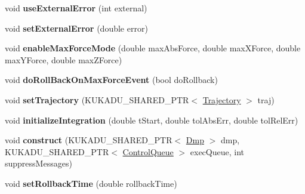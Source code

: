 \begin{DoxyCompactItemize}
\item 
\hypertarget{classkukadu_1_1DMPExecutor_af6bdcf008a271ebaf971e538ee7de962}{void {\bfseries use\-External\-Error} (int external)}\label{classkukadu_1_1DMPExecutor_af6bdcf008a271ebaf971e538ee7de962}

\item 
\hypertarget{classkukadu_1_1DMPExecutor_a0f61c96beb3e2d2d263d2de02da6afa4}{void {\bfseries set\-External\-Error} (double error)}\label{classkukadu_1_1DMPExecutor_a0f61c96beb3e2d2d263d2de02da6afa4}

\item 
\hypertarget{classkukadu_1_1DMPExecutor_a48f9f9b4b12ebce4423c0258be1c6eb5}{void {\bfseries enable\-Max\-Force\-Mode} (double max\-Abs\-Force, double max\-X\-Force, double max\-Y\-Force, double max\-Z\-Force)}\label{classkukadu_1_1DMPExecutor_a48f9f9b4b12ebce4423c0258be1c6eb5}

\item 
\hypertarget{classkukadu_1_1DMPExecutor_a4278c7a3e74556a5e2c40a7602743852}{void {\bfseries do\-Roll\-Back\-On\-Max\-Force\-Event} (bool do\-Rollback)}\label{classkukadu_1_1DMPExecutor_a4278c7a3e74556a5e2c40a7602743852}

\item 
\hypertarget{classkukadu_1_1DMPExecutor_a05c30d4373ffdedf10711d66ca7e979e}{void {\bfseries set\-Trajectory} (K\-U\-K\-A\-D\-U\-\_\-\-S\-H\-A\-R\-E\-D\-\_\-\-P\-T\-R$<$ \hyperlink{classkukadu_1_1Trajectory}{Trajectory} $>$ traj)}\label{classkukadu_1_1DMPExecutor_a05c30d4373ffdedf10711d66ca7e979e}

\item 
\hypertarget{classkukadu_1_1DMPExecutor_a3c6748e4c5731fa8d3721fb703cb8ec8}{void {\bfseries initialize\-Integration} (double t\-Start, double tol\-Abs\-Err, double tol\-Rel\-Err)}\label{classkukadu_1_1DMPExecutor_a3c6748e4c5731fa8d3721fb703cb8ec8}

\item 
\hypertarget{classkukadu_1_1DMPExecutor_a35e69b1d2f636f5ba9b7eb596c720aa4}{void {\bfseries construct} (K\-U\-K\-A\-D\-U\-\_\-\-S\-H\-A\-R\-E\-D\-\_\-\-P\-T\-R$<$ \hyperlink{classkukadu_1_1Dmp}{Dmp} $>$ dmp, K\-U\-K\-A\-D\-U\-\_\-\-S\-H\-A\-R\-E\-D\-\_\-\-P\-T\-R$<$ \hyperlink{classkukadu_1_1ControlQueue}{Control\-Queue} $>$ exec\-Queue, int suppress\-Messages)}\label{classkukadu_1_1DMPExecutor_a35e69b1d2f636f5ba9b7eb596c720aa4}

\item 
\hypertarget{classkukadu_1_1DMPExecutor_afefa7096a8b289cbd80c46662fbf0cad}{void {\bfseries set\-Rollback\-Time} (double rollback\-Time)}\label{classkukadu_1_1DMPExecutor_afefa7096a8b289cbd80c46662fbf0cad}


\end{DoxyCompactItemize}

